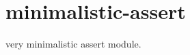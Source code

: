 \chapter{minimalistic-\/assert}
\hypertarget{md_node__modules_2minimalistic-assert_2readme}{}\label{md_node__modules_2minimalistic-assert_2readme}
very minimalistic assert module. 